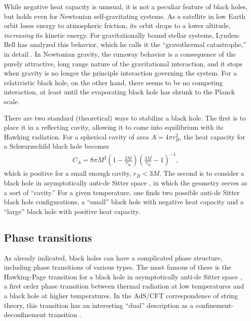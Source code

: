 \documentclass[12pt]{article}
\begin{document}
While negative heat capacity is unusual,
it is not a peculiar feature of black holes, but holds even
for Newtonian self-gravitating systems.  As a satellite in
low Earth orbit loses energy to atmospheric friction, its orbit drops
to a lower altitude, \emph{increasing} its kinetic energy.  For 
gravitationally bound stellar systems, Lynden-Bell has analyzed 
this behavior, which he calls it the ``gravothermal catastrophe,''
in detail \cite{LyndenBell}.  In Newtonian gravity, the runaway 
behavior is a consequence of the purely attractive, long range 
nature of the gravitational interaction, and it stops when gravity
is no longer the principle interaction governing the system.  For
a relativistic black hole, on the other hand, there seems to be no
competing interaction, at least until the evaporating black hole 
has shrunk to the Planck scale.

There are two standard (theoretical) ways to stabilize a black hole.
The first is to place it in a reflecting cavity, allowing it to come
into equilibrium with its Hawking radiation.  For a spherical cavity 
of area $A = 4\pi r_B^2$, the heat capacity for a Schwarzschild 
black hole becomes \cite{Yorkb}
\begin{align}
C_A = 8\pi M^2 \left(1-\frac{2M}{r_B}\right)%
          \left(\frac{3M}{r_B} -1\right)^{-1}  ,
\label{Carlipf3}
\end{align}
which is positive for a small enough cavity, $r_B<3M$.   The second
is to consider a black hole in asymptotically anti-de Sitter space
\cite{HawkingPage}, in which the geometry serves as a sort of 
``cavity.''  For a given temperature, one finds two possible anti-de 
Sitter black hole configurations, a ``small'' black hole with negative 
heat capacity and a ``large'' black hole with positive heat capacity.

\subsection{Phase transitions}

As already indicated, black holes can have a complicated phase
structure, including phase transitions of various types.  The most famous
of these is the Hawking-Page transition for a black hole in asymptotically 
anti-de Sitter space \cite{HawkingPage}, a first order phase transition 
between thermal radiation at low temperatures and a black hole at 
higher temperatures.  In the AdS/CFT correspondence of string theory, 
this transition has an interesting ``dual'' description as a confinement-%
deconfinement transition \cite{Witten_Page}.
\end{document}
